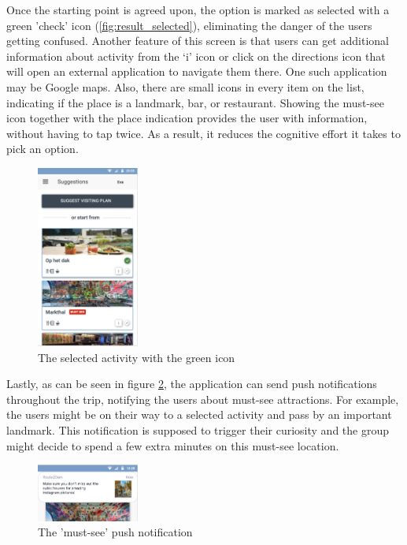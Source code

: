 \documentclass[11pt,a4paper,oneside]{article}
\begin{document}
Once the starting point is agreed upon, the option is marked as selected with a green 'check' icon (\autoref{fig:result_selected}), eliminating the danger of the users getting confused. Another feature of this screen is that users can get additional information about activity from the ‘i’ icon or click on the directions icon that will open an external application to navigate them there. One such application may be Google maps. Also, there are small icons in every item on the list, indicating if the place is a landmark, bar, or restaurant. Showing the must-see icon together with the place indication provides the user with information, without having to tap twice. As a result, it reduces the cognitive effort it takes to pick an option.

\begin{figure}[H]
    \centering
    \includegraphics[width=0.3\textwidth]{paper/imgs/hifi_prototypes/result_selected.png}
    \caption{The selected activity with the green icon}
    \label{fig:result_selected}
\end{figure}

Lastly, as can be seen in figure \ref{fig:must_see}, the application can send push notifications throughout the trip, notifying the users about must-see attractions. For example, the users might be on their way to a selected activity and pass by an important landmark. This notification is supposed to trigger their curiosity and the group might decide to spend a few extra minutes on this must-see location.

\begin{figure}[H]
    \centering
    \includegraphics[width=0.3\textwidth]{paper/imgs/hifi_prototypes/push_notification_must_see.png}
    \caption{The 'must-see' push notification}
    \label{fig:must_see}
\end{figure}
\end{document}

